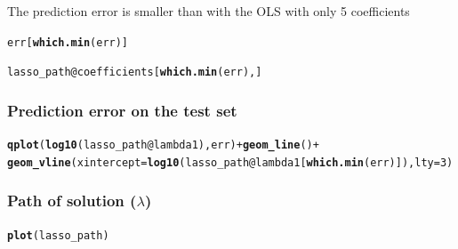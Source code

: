 \documentclass[10pt, c, xcolor=x11names]{beamer}\usepackage[]{graphicx}\usepackage[]{color}
\makeatletter
\newcommand{\hlnum}[1]{\textcolor[rgb]{0.686,0.059,0.569}{#1}}%
\newcommand{\hlopt}[1]{\textcolor[rgb]{0,0,0}{#1}}%
\newcommand{\hlstd}[1]{\textcolor[rgb]{0.345,0.345,0.345}{#1}}%
\newcommand{\hlkwc}[1]{\textcolor[rgb]{0.333,0.667,0.333}{#1}}%
\newcommand{\hlkwd}[1]{\textcolor[rgb]{0.737,0.353,0.396}{\textbf{#1}}}%
\newenvironment{kframe}{%
 \def\at@end@of@kframe{}%
 \ifinner\ifhmode%
  \def\at@end@of@kframe{\end{minipage}}%
  \begin{minipage}{\columnwidth}%
 \fi\fi%
 \def\FrameCommand##1{\hskip\@totalleftmargin \hskip-\fboxsep
 \colorbox{shadecolor}{##1}\hskip-\fboxsep
     \hskip-\linewidth \hskip-\@totalleftmargin \hskip\columnwidth}%
 \MakeFramed {\advance\hsize-\width
   \@totalleftmargin\z@ \linewidth\hsize
   \@setminipage}}%
 {\par\unskip\endMakeFramed%
 \at@end@of@kframe}
\newenvironment{knitrout}{}{} %
\makeatother
\begin{document}
\begin{frame}
\framebreak

The prediction error is smaller than with the OLS with only 5 coefficients
\begin{knitrout}\scriptsize
{}\color{fgcolor}\begin{kframe}
\begin{alltt}
\hlstd{err[}\hlkwd{which.min}\hlstd{(err)]}
\end{alltt}


{\ttfamily\noindent\bfseries\color{errorcolor}{\#\# Error in eval(expr, envir, enclos): object 'err' not found}}\begin{alltt}
\hlstd{lasso_path}\hlopt{@}\hlkwc{coefficients}\hlstd{[}\hlkwd{which.min}\hlstd{(err), ]}
\end{alltt}


{\ttfamily\noindent\bfseries\color{errorcolor}{\#\# Error in eval(expr, envir, enclos): object 'lasso\_path' not found}}\end{kframe}
\end{knitrout}

\end{frame}

\begin{frame}[containsverbatim]
  \frametitle{Prediction error on the test set}

\begin{knitrout}\scriptsize
{}\color{fgcolor}\begin{kframe}
\begin{alltt}
\hlkwd{qplot}\hlstd{(}\hlkwd{log10}\hlstd{(lasso_path}\hlopt{@}\hlkwc{lambda1}\hlstd{), err)} \hlopt{+} \hlkwd{geom_line}\hlstd{()} \hlopt{+}
\hlkwd{geom_vline}\hlstd{(}\hlkwc{xintercept} \hlstd{=} \hlkwd{log10}\hlstd{(lasso_path}\hlopt{@}\hlkwc{lambda1}\hlstd{[}\hlkwd{which.min}\hlstd{(err)]),} \hlkwc{lty}\hlstd{=}\hlnum{3}\hlstd{)}
\end{alltt}


{\ttfamily\noindent\bfseries\color{errorcolor}{\#\# Error in data.frame(xintercept = xintercept): object 'lasso\_path' not found}}\end{kframe}
\end{knitrout}
\end{frame}

\begin{frame}[containsverbatim]
  \frametitle{Path of solution ($\lambda$)}

\begin{knitrout}\scriptsize
{}\color{fgcolor}\begin{kframe}
\begin{alltt}
\hlkwd{plot}\hlstd{(lasso_path)}
\end{alltt}


{\ttfamily\noindent\bfseries\color{errorcolor}{\#\# Error in plot(lasso\_path): object 'lasso\_path' not found}}\end{kframe}
\end{knitrout}
\end{frame}
\end{document}
